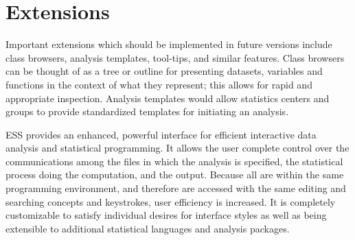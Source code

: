 \documentclass{article}
\newcommand*{\SAS}{\textsc{SAS}}
\begin{document}

\section{Extensions}
\label{sec:extensions}



Important extensions which should be implemented in future
versions include class browsers, analysis templates, tool-tips, and
similar features.  Class browsers can be thought of as a tree or
outline for presenting datasets, variables and functions in the
context of what they represent; this allows for rapid and appropriate
inspection.  Analysis templates would allow statistics centers and
groups to provide standardized templates for initiating an analysis.

ESS provides 
an enhanced, powerful interface for efficient interactive data
analysis and statistical programming.  
It allows the user complete control over the communications among the
files in which the analysis is specified, the statistical process doing
the computation, and the output.  Because all are within the same programming
environment, and therefore are accessed with the same
editing and searching concepts and keystrokes, user efficiency is increased.
It is completely customizable
to satisfy individual desires for interface styles as well as being
extensible to additional statistical languages and analysis packages.
\end{document}
